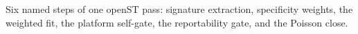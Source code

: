 Six named steps of one openST pass: signature extraction, specificity weights, the weighted fit, the platform self-gate, the reportability gate, and the Poisson close.
